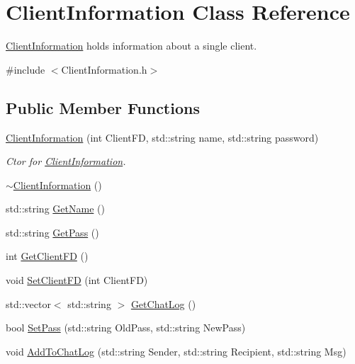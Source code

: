 \hypertarget{class_client_information}{}\section{Client\+Information Class Reference}
\label{class_client_information}


\hyperlink{class_client_information}{Client\+Information} holds information about a single client.  




{\ttfamily \#include $<$Client\+Information.\+h$>$}

\subsection*{Public Member Functions}
\begin{DoxyCompactItemize}
\item 
\hyperlink{class_client_information_a1fe9a21d2ecea1d894be55cba29104e6}{Client\+Information} (int Client\+F\+D, std\+::string name, std\+::string password)
\begin{DoxyCompactList}\small\item\em Ctor for \hyperlink{class_client_information}{Client\+Information}. \end{DoxyCompactList}\item 
\hyperlink{class_client_information_a9de9a77b339824c706691893b79a18a7}{$\sim$\+Client\+Information} ()
\item 
std\+::string \hyperlink{class_client_information_a12b8606eb3024e12b912d5d885cb226c}{Get\+Name} ()
\item 
std\+::string \hyperlink{class_client_information_a5fadcb0b87d421a84615cff3abb95ae8}{Get\+Pass} ()
\item 
int \hyperlink{class_client_information_a3d17d21fcb54dda5e049170a551b9d2c}{Get\+Client\+F\+D} ()
\item 
void \hyperlink{class_client_information_a6d7fdc020a75aefdb8555b1ec28e0f2c}{Set\+Client\+F\+D} (int Client\+F\+D)
\item 
std\+::vector$<$ std\+::string $>$ \hyperlink{class_client_information_a96a85745cf82df2710ec1b137f157b4f}{Get\+Chat\+Log} ()
\item 
bool \hyperlink{class_client_information_adf5d94358da6103f56248c04de4072f2}{Set\+Pass} (std\+::string Old\+Pass, std\+::string New\+Pass)
\item 
void \hyperlink{class_client_information_a9c13a10fd4adfe477f48f334c61aa788}{Add\+To\+Chat\+Log} (std\+::string Sender, std\+::string Recipient, std\+::string Msg)
\end{DoxyCompactItemize}
